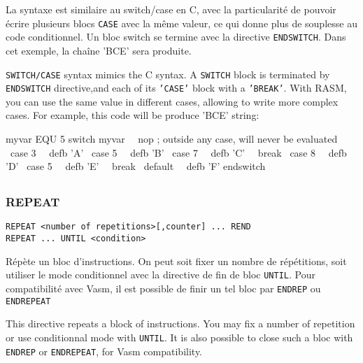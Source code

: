 \begin{xfr}
La syntaxe est similaire au switch/case en C, avec la particularité de pouvoir écrire plusieurs blocs \texttt{CASE} avec la même valeur, ce qui donne plus de souplesse au code conditionnel. Un bloc switch se termine avec la directive \texttt{ENDSWITCH}.
Dans cet exemple, la chaîne 'BCE' sera produite.
\end{xfr}

\begin{xen}
\texttt{SWITCH/CASE} syntax mimics the C syntax.  A \texttt{SWITCH} block is terminated by \texttt{ENDSWITCH} directive,and each of its \texttt{'CASE'} block with a \texttt{'BREAK'}. With RASM, you can use the same value in different cases, allowing to write more complex cases. For example, this code will be produce 'BCE' string:
\end{xen}

\begin{code}
myvar EQU 5
\medskip
switch myvar
\ \ nop 		; outside any case, will never be evaluated
\ case 3
\ \ defb 'A'
\ case 5
\ \ defb 'B'
\ case 7
\ \ defb 'C'
\ \ break
\ case 8
\ \ defb 'D'
\ case 5
\ \ defb 'E'
\ \ break
\ default
\ \ defb 'F'
endswitch
\end{code}


\subsection{}

\subsubsection{REPEAT}

\begin{verbatim}
REPEAT <number of repetitions>[,counter] ... REND
REPEAT ... UNTIL <condition>
\end{verbatim}

\begin{xfr}
Répète un bloc d'instructions.
On peut soit fixer un nombre de répétitions, soit utiliser le mode conditionnel avec la directive de fin de bloc \texttt{UNTIL}. Pour compatibilité avec Vasm, il est possible de finir un tel bloc par \texttt{ENDREP} ou \texttt{ENDREPEAT}
\end{xfr}

\begin{xen}
This directive repeats a block of instructions. You may fix a number of repetition or use conditionnal mode with \texttt{UNTIL}. It is also possible to close such a bloc with \texttt{ENDREP} or \texttt{ENDREPEAT}, for Vasm compatibility.
\end{xen}

